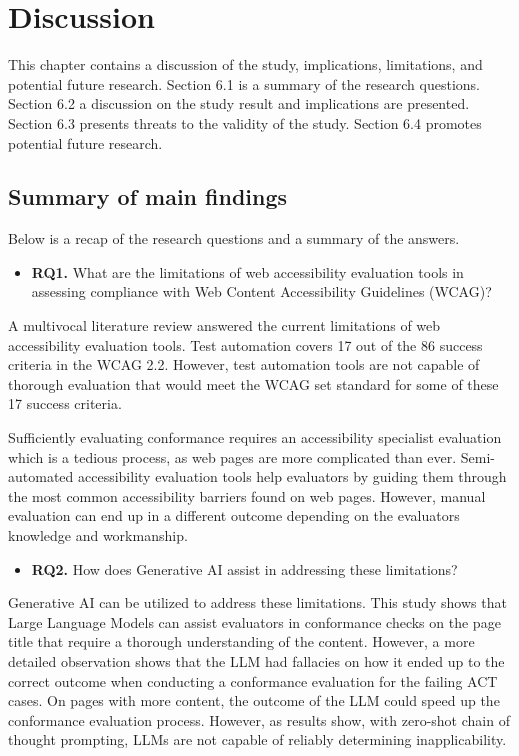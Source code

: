 \chapter{Discussion\label{discussion}}

This chapter contains a discussion of the study, implications, limitations, and potential future research. Section 6.1 is a summary of the research questions. Section 6.2 a discussion on the study result and implications are presented. Section 6.3 presents threats to the validity of the study. Section 6.4 promotes potential future research.

\section{Summary of main findings}

Below is a recap of the research questions and a summary of the answers.

\begin{itemize}
    \item \textbf{RQ1.} What are the limitations of web accessibility evaluation tools in assessing compliance with Web Content Accessibility Guidelines (WCAG)?
\end{itemize}

    A multivocal literature review answered the current limitations of web accessibility evaluation tools. Test automation covers 17 out of the 86 success criteria in the WCAG 2.2. However, test automation tools are not capable of thorough evaluation that would meet the WCAG set standard for some of these 17 success criteria. 

    Sufficiently evaluating conformance requires an accessibility specialist evaluation which is a tedious process, as web pages are more complicated than ever. Semi-automated accessibility evaluation tools help evaluators by guiding them through the most common accessibility barriers found on web pages. However, manual evaluation can end up in a different outcome depending on the evaluators knowledge and workmanship.
    
\begin{itemize}
    \item \textbf{RQ2.} How does Generative AI assist in addressing these limitations?
\end{itemize}

    Generative AI can be utilized to address these limitations. This study shows that Large Language Models can assist evaluators in conformance checks on the page title that require a thorough understanding of the content. However, a more detailed observation shows that the LLM had fallacies on how it ended up to the correct outcome when conducting a conformance evaluation for the failing ACT cases. On pages with more content, the outcome of the LLM could speed up the conformance evaluation process. However, as results show, with zero-shot chain of thought prompting, LLMs are not capable of reliably determining inapplicability.

